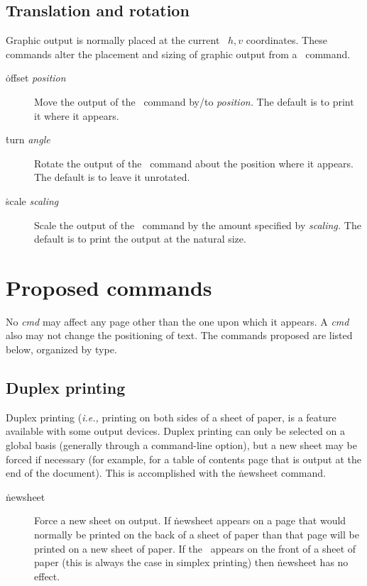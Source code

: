 \subsection{Translation and rotation}
Graphic output is normally placed at the current \DVI\ $h,v$ coordinates.
These commands alter the placement and sizing of graphic output from a
\Special\ command.
\begin{description}
\item[\.{offset} {\it position\/}] Move the output of the \Special\
         command by/to {\it position.\/} The default is to print it
         where it appears.
\item[\.{turn} {\it angle\/}] Rotate the output of the \Special\
         command about the position where it appears. The default is
         to leave it unrotated.
\item[\.{scale} {\it scaling\/}] Scale the output of the \Special\
         command by the amount specified by {\it scaling.\/} The default
         is to print the output at the natural size.
\end{description}

\section{Proposed  commands}\label{sec:cmds}
No {\it cmd\/} may affect any page other than the one upon
which it appears. A {\it cmd\/} also may not change the positioning
of text. The commands proposed are listed below, organized by type.

\subsection{Duplex printing}
Duplex printing ({\it i.e.,\/} printing on both sides of a sheet of
paper, is a feature available with some output devices. Duplex printing
can only be selected on a global basis (generally through a command-line
option), but a new sheet may be forced if necessary (for example, for
a table of contents page that is output at the end of the document).
This is accomplished with the \.{newsheet} command.
\begin{description}
\item[\.{newsheet}] Force a new sheet on output. If \.{newsheet} appears
         on a page that would normally be printed on the back of a sheet
         of paper than that page will be printed on a new sheet of paper.
         If the \Special\ appears on the front of a sheet of paper (this
         is always the case in simplex printing) then \.{newsheet} has no
         effect.
\end{description}

